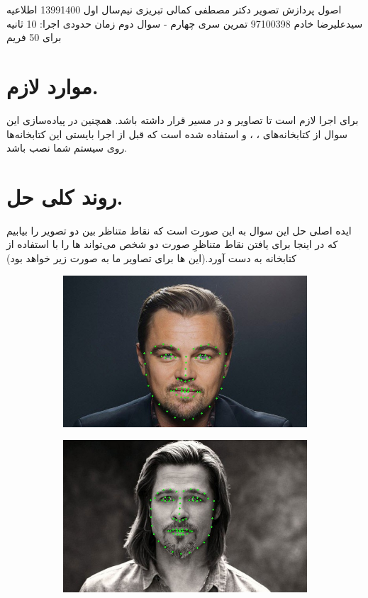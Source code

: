 \documentclass[a4paper,12pt]{article}
\begin{document}
\handout
{اصول پردازش تصویر}
{دکتر مصطفی کمالی تبریزی}
{نیم‌سال اول 1399\lr{-}1400}
{اطلاعیه}
{سیدعلیرضا خادم}
{97100398}
{تمرین سری چهارم - سوال دوم}
زمان حدودی اجرا: 10 ثانیه برای 50 فریم
\section*{موارد لازم.}
برای اجرا لازم است تا تصاویر 
و
در مسیر
قرار داشته باشد. همچنین در پیاده‌سازی این سوال از کتابخانه‌های 
،
 ،
و
استفاده شده است که قبل از اجرا بایستی این کتابخانه‌ها روی سیستم شما نصب باشد.
\section*{روند کلی حل.}
ایده اصلی حل این سوال به این صورت است که نقاط متناظر بین دو تصویر را بیابیم که در اینجا برای یافتن نقاط متناظرِ صورت دو شخص می‌تواند 
‌ها
را با استفاده از کتابخانه 
به دست آورد.(این 
‌ها
برای تصاویر ما به صورت زیر خواهد بود)
\begin{figure}[H]
	\centering
	\begin{subfigure}{0.5\textwidth}
		\centering
		\includegraphics[width=.9\textwidth]{1.jpg}
	\end{subfigure}%
	\begin{subfigure}{0.5\textwidth}
		\centering
		\includegraphics[width=.9\textwidth]{2.jpg}
	\end{subfigure}%
\end{figure}
\end{document}
